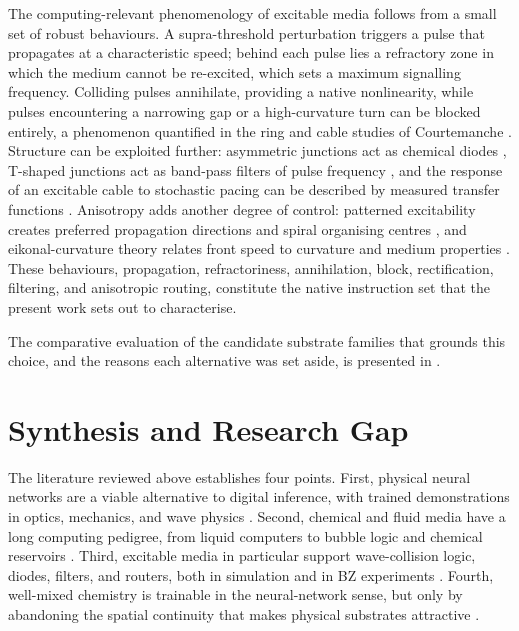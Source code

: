 The computing-relevant phenomenology of excitable media follows from a small set of robust behaviours. A supra-threshold perturbation triggers a pulse that propagates at a characteristic speed; behind each pulse lies a refractory zone in which the medium cannot be re-excited, which sets a maximum signalling frequency. Colliding pulses annihilate, providing a native nonlinearity, while pulses encountering a narrowing gap or a high-curvature turn can be blocked entirely, a phenomenon quantified in the ring and cable studies of Courtemanche \etal \cite{courtemanche1993instabilities}. Structure can be exploited further: asymmetric junctions act as chemical diodes \cite{agladze1996chemical}, T-shaped junctions act as band-pass filters of pulse frequency \cite{gorecka2003tshaped}, and the response of an excitable cable to stochastic pacing can be described by measured transfer functions \cite{delange2009transfer}. Anisotropy adds another degree of control: patterned excitability creates preferred propagation directions and spiral organising centres \cite{steinbock1995anisotropy}, and eikonal-curvature theory relates front speed to curvature and medium properties \cite{keener1991eikonal}. These behaviours, propagation, refractoriness, annihilation, block, rectification, filtering, and anisotropic routing, constitute the native instruction set that the present work sets out to characterise.

The comparative evaluation of the candidate substrate families that grounds this choice, and the reasons each alternative was set aside, is presented in .

\section{Synthesis and Research Gap}
\label{sec:lit_synthesis}

The literature reviewed above establishes four points. First, physical neural networks are a viable alternative to digital inference, with trained demonstrations in optics, mechanics, and wave physics \cite{lin2018alloptical, stern2021physical, wright2022deep, hughes2019wave}. Second, chemical and fluid media have a long computing pedigree, from liquid computers to bubble logic and chemical reservoirs \cite{adamatzky2019liquid, prakash2007bubble, baltussen2024chemical}. Third, excitable media in particular support wave-collision logic, diodes, filters, and routers, both in simulation and in BZ experiments \cite{toth1995logic, steinbock1996chemical, adamatzky2002xor, agladze1996chemical, gorecka2003tshaped}. Fourth, well-mixed chemistry is trainable in the neural-network sense, but only by abandoning the spatial continuity that makes physical substrates attractive \cite{dack2024rncrn, cherry2018scaling}.


